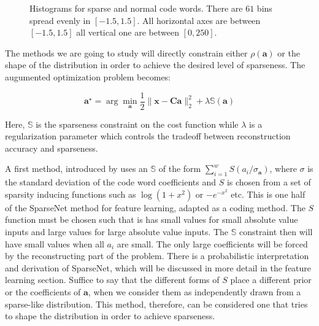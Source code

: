 \documentclass[12pt,a4paper,oneside,english]{UPBThesis}
\begin{document}
\begin{figure}
\centering
{}
\label{fig:CodingMethodsCoeffHists}
\caption{Histograms for sparse and normal code words. There are $61$ bins spread evenly in $[-1.5,1.5]$. All horizontal axes are between $[-1.5,1.5]$ all vertical one are between $[0,250]$.}
\end{figure}

The methods we are going to study will directly constrain either $\rho(\textbf{a})$ or the shape of the distribution in order to achieve the desired level of sparseness. The augumented optimization problem becomes:

\begin{equation*}
\textbf{a}^{\star} = \arg\min_{\textbf{a}} \frac{1}{2} \| \textbf{x} - \textbf{C}\textbf{a} \|_2^2 + \lambda \mathbb{S}(\textbf{a})
\end{equation*}

Here, $\mathbb{S}$ is the sparseness constraint on the cost function while $\lambda$ is a regularization parameter which controls the tradeoff between reconstruction accuracy and sparseness.

A first method, introduced by \cite{emergence-sparse-coding} uses an $\mathbb{S}$ of the form $\sum_{i=1}^w{S(a_i / \sigma_{\textbf{a}})}$, where $\sigma$ is the standard deviation of the code word coefficients and $S$ is chosen from a set of sparsity inducing functions such as $\log(1 + x^2)$ or $-e^{-x^2}$ etc. This is one half of the SparseNet method for feature learning, adapted as a coding method. The $S$ function must be chosen such that is has small values for small absolute value inputs and large values for large absolute value inputs. The $\mathbb{S}$ constraint then will have small values when all $a_i$ are small. The only large coefficients will be forced by the reconstructing part of the problem. There is a probabilistic interpretation and derivation of SparseNet, which will be discussed in more detail in the feature learning section. Suffice to say that the different forms of $S$ place a different prior or the coefficients of $\textbf{a}$, when we consider them as independently drawn from a sparse-like distribution. This method, therefore, can be considered one that tries to shape the distribution in order to achieve sparseness.
\end{document}
